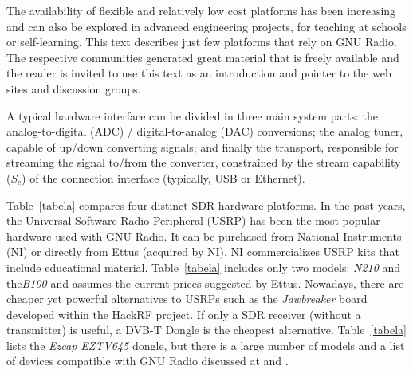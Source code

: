 The availability of flexible and relatively low cost platforms has been increasing and can also be explored in advanced engineering projects, for teaching at schools or self-learning.
This text describes just few platforms that rely on GNU Radio. The respective communities generated great material that is freely available and the reader is invited to use this text as an introduction and pointer to the web sites and discussion groups.

A typical hardware interface can be divided in three main system parts: the analog-to-digital (ADC) / digital-to-analog 
(DAC) conversions; the analog tuner, capable of up/down converting signals; and finally the transport,
responsible for streaming the signal to/from the converter, constrained by the stream capability ($S_c$) of the connection interface (typically, USB or Ethernet). 


Table~\ref{tabela} compares four distinct SDR hardware platforms. In the past years, the Universal Software Radio Peripheral (USRP) has been the most popular hardware used with GNU Radio. It can be purchased from National Instruments (NI) or directly from Ettus (acquired by NI). NI commercializes USRP kits that include educational material. Table~\ref{tabela} includes only two models: \textit{N210} and the\textit{B100} and assumes the current prices suggested by Ettus. 
Nowadays, there are cheaper yet powerful alternatives to USRPs such as the \textit{Jawbreaker} board developed within the  HackRF project. If only a SDR receiver (without a transmitter) is useful, a DVB-T Dongle is the cheapest alternative. Table~\ref{tabela} lists the \textit{Ezcap EZTV645} dongle, but there is a large number of models and a list of devices compatible with GNU Radio discussed at  and  .

